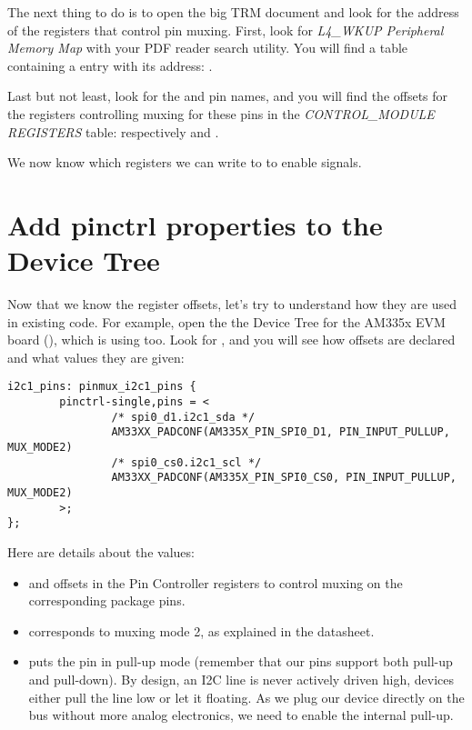The next thing to do is to open the big TRM document and look for the
address of the registers that control pin muxing. First, look for
{\em L4\_WKUP Peripheral Memory Map} with your PDF reader search
utility. You will find a table containing a
 entry with its address:
.

Last but not least, look for the  and 
pin names, and you will find the offsets for the registers controlling
muxing for these pins in the {\em CONTROL\_MODULE REGISTERS} table:
respectively  and .

We now know which registers we can write to to enable 
signals.

\section{Add pinctrl properties to the Device Tree}

Now that we know the register offsets, let's try to understand
how they are used in existing code. For example, open the
the Device Tree for the AM335x EVM board
(), which is using
 too. Look for , and you will see how
offsets are declared and what values they are given:

{\small
\begin{verbatim}
i2c1_pins: pinmux_i2c1_pins {
        pinctrl-single,pins = <
                /* spi0_d1.i2c1_sda */
                AM33XX_PADCONF(AM335X_PIN_SPI0_D1, PIN_INPUT_PULLUP, MUX_MODE2)
                /* spi0_cs0.i2c1_scl */
                AM33XX_PADCONF(AM335X_PIN_SPI0_CS0, PIN_INPUT_PULLUP, MUX_MODE2)
        >;
};
\end{verbatim}
}

Here are details about the values:

\begin{itemize}
\item {} and  offsets
      in the Pin Controller registers to control muxing on the
      corresponding package pins.
\item {} corresponds to muxing mode 2, as explained in the
      datasheet.
\item {} puts the pin in pull-up mode (remember
      that our pins support both pull-up and pull-down). By design, an
      I2C line is never actively driven high, devices either pull the
      line low or let it floating. As we plug our device directly on the
      bus without more analog electronics, we need to enable the
      internal pull-up.
\end{itemize}

